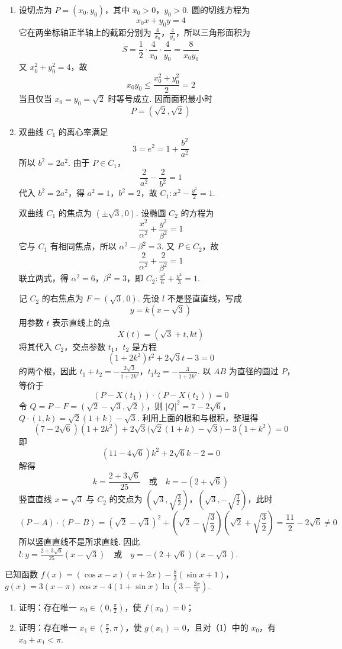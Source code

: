 \begin{solution}
\begin{enumerate}
\item
设切点为 \(P=(x_0,y_0)\)，其中 \(x_0>0\)，\(y_0>0\). 圆的切线方程为
\[
x_0x+y_0y=4
\]
它在两坐标轴正半轴上的截距分别为 \(\frac4{x_0}\)，\(\frac4{y_0}\)，所以三角形面积为
\[
S=\frac12\cdot\frac4{x_0}\cdot\frac4{y_0}=\frac8{x_0y_0}
\]
又 \(x_0^2+y_0^2=4\)，故
\[
x_0y_0\leqslant\frac{x_0^2+y_0^2}{2}=2
\]
当且仅当 \(x_0=y_0=\sqrt2\) 时等号成立. 因而面积最小时
\[
P=(\sqrt2,\sqrt2)
\]

\item
双曲线 \(C_1\) 的离心率满足
\[
3=e^2=1+\frac{b^2}{a^2}
\]
所以 \(b^2=2a^2\). 由于 \(P\in C_1\)，
\[
\frac2{a^2}-\frac2{b^2}=1
\]
代入 \(b^2=2a^2\)，得 \(a^2=1\)，\(b^2=2\)，故
\(C_1\colon x^2-\frac{y^2}{2}=1\).

双曲线 \(C_1\) 的焦点为 \((\pm\sqrt3,0)\). 设椭圆 \(C_2\) 的方程为
\[
\frac{x^2}{\alpha^2}+\frac{y^2}{\beta^2}=1
\]
它与 \(C_1\) 有相同焦点，所以 \(\alpha^2-\beta^2=3\). 又 \(P\in C_2\)，故
\[
\frac2{\alpha^2}+\frac2{\beta^2}=1
\]
联立两式，得 \(\alpha^2=6\)，\(\beta^2=3\)，即
\(C_2\colon \frac{x^2}{6}+\frac{y^2}{3}=1\).

记 \(C_2\) 的右焦点为 \(F=(\sqrt3,0)\). 先设 \(l\) 不是竖直直线，写成
\[
y=k(x-\sqrt3)
\]
用参数 \(t\) 表示直线上的点
\[
X(t)=(\sqrt3+t,kt)
\]
将其代入 \(C_2\)，交点参数 \(t_1\)，\(t_2\) 是方程
\[
(1+2k^2)t^2+2\sqrt3t-3=0
\]
的两个根，因此
\(t_1+t_2=-\frac{2\sqrt3}{1+2k^2}\)，\(t_1t_2=-\frac3{1+2k^2}\).
以 \(AB\) 为直径的圆过 \(P\)，等价于
\[
(P-X(t_1))\cdot(P-X(t_2))=0
\]
令 \(Q=P-F=(\sqrt2-\sqrt3,\sqrt2)\)，则
\(\lvert Q\rvert^2=7-2\sqrt6\)，\(Q\cdot(1,k)=\sqrt2(1+k)-\sqrt3\).
利用上面的根和与根积，整理得
\[
(7-2\sqrt6)(1+2k^2)+2\sqrt3\bigl(\sqrt2(1+k)-\sqrt3\bigr)-3(1+k^2)=0
\]
即
\[
(11-4\sqrt6)k^2+2\sqrt6k-2=0
\]
解得
\[
k=\frac{2+3\sqrt6}{25}\quad\text{或}\quad k=-(2+\sqrt6)
\]
竖直直线 \(x=\sqrt3\) 与 \(C_2\) 的交点为 \(\left(\sqrt3,\sqrt{\frac32}\right)\)，\(\left(\sqrt3,-\sqrt{\frac32}\right)\)，此时
\[
(P-A)\cdot(P-B)=\left(\sqrt2-\sqrt3\right)^2+\left(\sqrt2-\sqrt{\frac32}\right)\left(\sqrt2+\sqrt{\frac32}\right)
=\frac{11}{2}-2\sqrt6\neq0
\]
所以竖直直线不是所求直线. 因此
\(l\colon y=\frac{2+3\sqrt6}{25}(x-\sqrt3) \quad\text{或}\quad y=-(2+\sqrt6)(x-\sqrt3)\).
\end{enumerate}
\end{solution}

\begin{problem}
已知函数 \(f(x) = (\cos x - x)(\pi + 2x) - \frac{8}{3} (\sin x + 1)\)，\(g(x) = 3(x - \pi)\cos x - 4(1 + \sin x)\ln \left(3 - \frac{2x}{\pi}\right)\).

\begin{enumerate}
\item 证明：存在唯一 \(x_0 \in \left(0, \frac{\pi}{2}\right)\)，使 \(f(x_0) = 0\)；
\item 证明：存在唯一 \(x_{1} \in \left(\frac{\pi}{2}, \pi\right)\)，使 \(g(x_{1}) = 0\)，且对（1）中的 \(x_{0}\)，有 \(x_{0} + x_{1} < \pi\).
\end{enumerate}
\end{problem}

